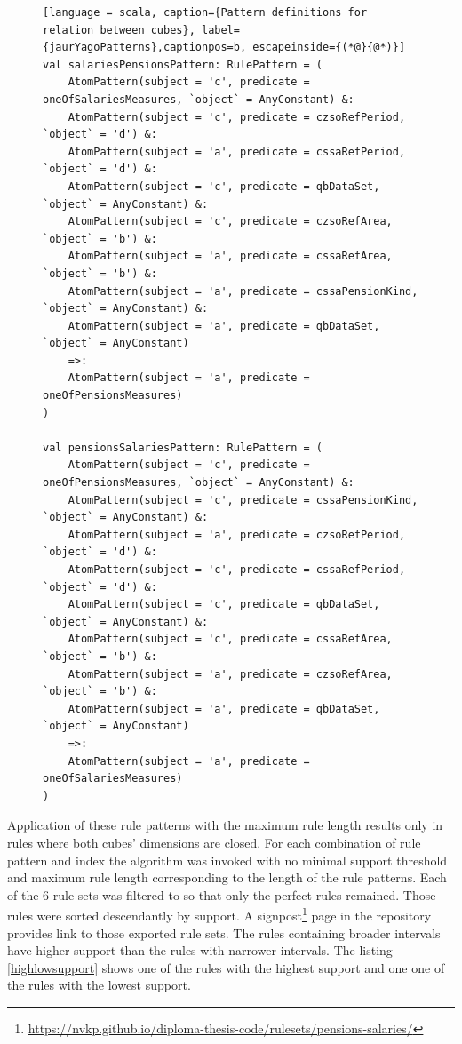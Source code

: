 \begin{figure}[h]
\begin{lstlisting}[language = scala, caption={Pattern definitions for relation between cubes}, label={jaurYagoPatterns},captionpos=b, escapeinside={(*@}{@*)}]
val salariesPensionsPattern: RulePattern = (
    AtomPattern(subject = 'c', predicate = oneOfSalariesMeasures, `object` = AnyConstant) &:
    AtomPattern(subject = 'c', predicate = czsoRefPeriod, `object` = 'd') &:
    AtomPattern(subject = 'a', predicate = cssaRefPeriod, `object` = 'd') &:
    AtomPattern(subject = 'c', predicate = qbDataSet, `object` = AnyConstant) &:
    AtomPattern(subject = 'c', predicate = czsoRefArea, `object` = 'b') &:
    AtomPattern(subject = 'a', predicate = cssaRefArea, `object` = 'b') &:
    AtomPattern(subject = 'a', predicate = cssaPensionKind, `object` = AnyConstant) &:
    AtomPattern(subject = 'a', predicate = qbDataSet, `object` = AnyConstant)
    =>:
    AtomPattern(subject = 'a', predicate = oneOfPensionsMeasures)
)

val pensionsSalariesPattern: RulePattern = (
    AtomPattern(subject = 'c', predicate = oneOfPensionsMeasures, `object` = AnyConstant) &:
    AtomPattern(subject = 'c', predicate = cssaPensionKind, `object` = AnyConstant) &:
    AtomPattern(subject = 'a', predicate = czsoRefPeriod, `object` = 'd') &:
    AtomPattern(subject = 'c', predicate = cssaRefPeriod, `object` = 'd') &:
    AtomPattern(subject = 'c', predicate = qbDataSet, `object` = AnyConstant) &:
    AtomPattern(subject = 'c', predicate = cssaRefArea, `object` = 'b') &:
    AtomPattern(subject = 'a', predicate = czsoRefArea, `object` = 'b') &:
    AtomPattern(subject = 'a', predicate = qbDataSet, `object` = AnyConstant)
    =>:
    AtomPattern(subject = 'a', predicate = oneOfSalariesMeasures)
)
\end{lstlisting}
\end{figure}

Application of these rule patterns with the maximum rule length results only in rules where both cubes' dimensions are closed. For each combination of rule pattern and index the algorithm was invoked with no minimal support threshold and maximum rule length corresponding to the length of the rule patterns. Each of the 6 rule sets was filtered to so that only the perfect rules remained. Those rules were sorted descendantly by support. A signpost\footnote{\href{https://nvkp.github.io/diploma-thesis-code/rulesets/pensions-salaries/}{https://nvkp.github.io/diploma-thesis-code/rulesets/pensions-salaries/}} page in the repository provides link to those exported rule sets. The rules containing broader intervals have higher support than the rules with narrower intervals. The listing \ref{highlowsupport} shows one of the rules with the highest support and one one of the rules with the lowest support.


